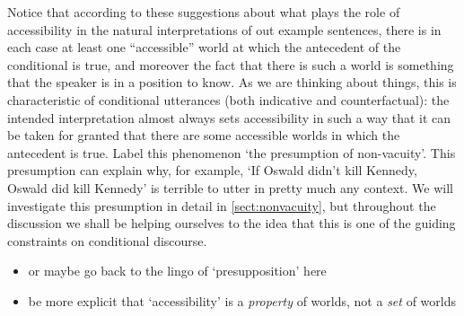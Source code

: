 \documentclass[If.tex]{subfiles}
\begin{document}
Notice that according to these suggestions about what plays the role of accessibility in the natural interpretations of out example sentences, there is in each case at least one “accessible” world at which the antecedent of the conditional is true, and moreover the fact that there is such a world is something that the speaker is in a position to know. As we are thinking about things, this is characteristic of conditional utterances (both indicative and counterfactual): the intended interpretation almost always sets accessibility in such a way that it can be taken for granted that there are some accessible worlds in which the antecedent is true. Label this phenomenon ‘the presumption of non-vacuity’.  This presumption can explain why, for example, ‘If Oswald didn't kill Kennedy, Oswald did kill Kennedy’ is terrible to utter in pretty much any context.  We will investigate this presumption in detail in \autoref{sect:nonvacuity}, but throughout the discussion we shall be helping ourselves to the idea that this is one of the guiding constraints on conditional discourse.
\begin{itemize} 
	\item
	or maybe go back to the lingo of ‘presupposition’ here
	\item
	be more explicit that ‘accessibility’ is a \emph{property} of worlds, not a \emph{set} of worlds 
\end{itemize}
\end{document}
